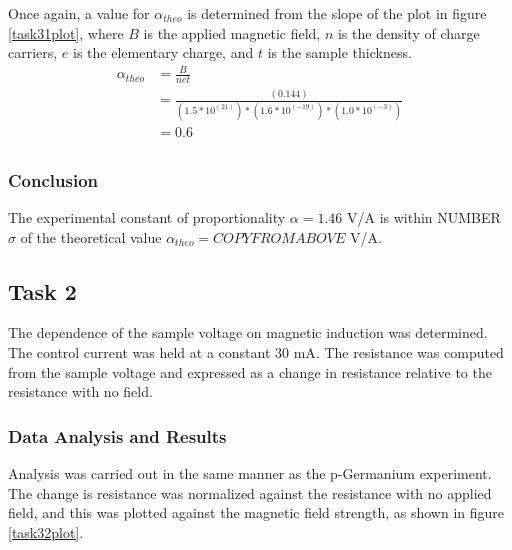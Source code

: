 \documentclass[a4paper]{article}
\begin{document}
\qq Once again, a value for $\alpha_{theo}$ is determined from the
slope of the plot in figure \ref{task31plot}, where $B$ is the applied
magnetic field, $n$ is the density of charge carriers, $e$ is the
elementary charge, and $t$ is the sample thickness.
\begin{align*}
\alpha_{theo} &= \frac{B}{net} \\
              &= \frac{(0.144)}{(1.5 * 10^(21))*(1.6 * 10^(-19))*(1.0 * 10^(-3))} \\
			  &= 0.6 \\
\end{align*}

\subsubsection{Conclusion}
The experimental constant of proportionality $\alpha = 1.46 $ V/A is within NUMBER $\sigma$ of the theoretical value $\alpha_{theo} = COPYFROMABOVE$ V/A.

\subsection{Task 2}

\qq The dependence of the sample voltage on magnetic induction was
determined. The control current was held at a constant 30 mA. The
resistance was computed from the sample voltage and expressed as a
change in resistance relative to the resistance with no field.

\subsubsection{Data Analysis and Results}
\qq Analysis was carried out in the same manner as the p-Germanium
experiment. The change is resistance was normalized against the
resistance with no applied field, and this was plotted against the
magnetic field strength, as shown in figure \ref{task32plot}.
\end{document}
